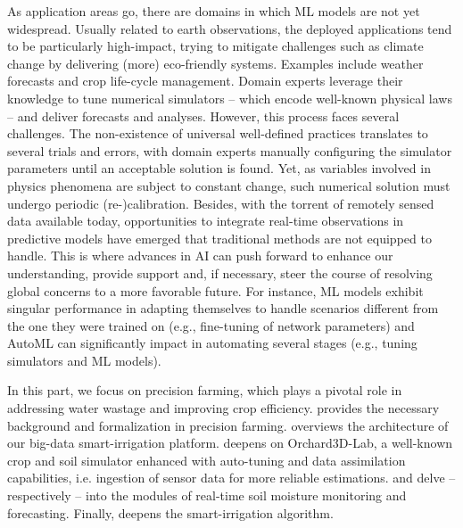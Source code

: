 \documentclass[a4paper,12pt,times,numbered,print,index]{Classes/PhDThesisPSnPDF}
\begin{document}
As application areas go, there are domains in which ML models are not yet widespread.
Usually related to earth observations, the deployed applications tend to be particularly high-impact, trying to mitigate challenges such as climate change by delivering (more) eco-friendly systems. 
Examples include weather forecasts and crop life-cycle management.
Domain experts leverage their knowledge to tune numerical simulators -- which encode well-known physical laws -- and deliver forecasts and analyses.
However, this process faces several challenges. 
The non-existence of universal well-defined practices translates to several trials and errors, with domain experts manually configuring the simulator parameters until an acceptable solution is found.
Yet, as variables involved in physics phenomena are subject to constant change, such numerical solution must undergo periodic (re-)calibration.
Besides, with the torrent of remotely sensed data available today, opportunities to integrate real-time observations in predictive models have emerged that traditional methods are not equipped to handle. 
This is where advances in AI can push forward to enhance our understanding, provide support and, if necessary, steer the course of resolving global concerns to a more favorable future.
For instance, ML models exhibit singular performance in adapting themselves to handle scenarios different from the one they were trained on (e.g., fine-tuning of network parameters) and AutoML can significantly impact in automating several stages (e.g., tuning simulators and ML models).

In this part, we focus on precision farming, which plays a pivotal role in addressing water wastage and improving crop efficiency.
 provides the necessary background and formalization in precision farming.
 overviews the architecture of our big-data smart-irrigation platform.
 deepens on Orchard3D-Lab, a well-known crop and soil simulator enhanced with auto-tuning and data assimilation capabilities, i.e. ingestion of sensor data for more reliable estimations.
 and  delve -- respectively -- into the modules of real-time soil moisture monitoring and forecasting.
Finally,  deepens the smart-irrigation algorithm.
\end{document}
